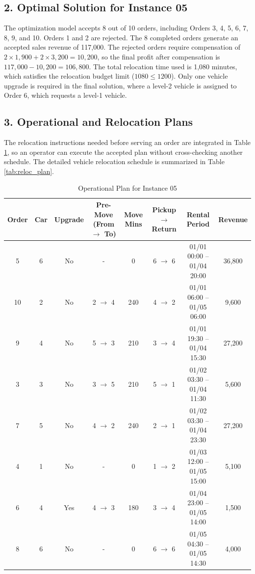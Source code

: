 \documentclass[10pt,a4paper]{article}
\begin{document}
\subsection*{2. Optimal Solution for Instance 05}

\hspace{2em} The optimization model accepts 8 out of 10 orders, including Orders 3, 4, 5, 6, 7, 8, 9, and 10. Orders 1 and 2 are rejected. The 8 completed orders generate an accepted sales revenue of 117,000. The rejected orders require compensation of $2 \times 1{,}900 + 2 \times 3{,}200 = 10{,}200$, so the final profit after compensation is $117{,}000 - 10{,}200 = 106{,}800$. The total relocation time used is 1,080 minutes, which satisfies the relocation budget limit ($1080 \le 1200$). Only one vehicle upgrade is required in the final solution, where a level-2 vehicle is assigned to Order 6, which requests a level-1 vehicle.

\subsection*{3. Operational and Relocation Plans}

The relocation instructions needed before serving an order are integrated in Table \ref{tab:op_plan}, so an operator can execute the accepted plan without cross-checking another schedule. The detailed vehicle relocation schedule is summarized in Table \ref{tab:reloc_plan}.

\begin{table}[htbp]
\centering
\small
\caption{Operational Plan for Instance 05\label{tab:op_plan}}
\begin{tabular}{cccccccc}
\toprule
Order & Car & Upgrade & Pre-Move (From $\to$ To) & Move Mins
& Pickup $\rightarrow$ Return & Rental Period & Revenue \\
\midrule
5 & 6 & No & - & 0 & 6 $\rightarrow$ 6 & 01/01 00:00 -- 01/04 20:00 & 36,800 \\
10 & 2 & No & 2 $\rightarrow$ 4 & 240 & 4 $\rightarrow$ 2 & 01/01 06:00 -- 01/05 06:00 & 9,600 \\
9 & 4 & No & 5 $\rightarrow$ 3 & 210 & 3 $\rightarrow$ 4 & 01/01 19:30 -- 01/04 15:30 & 27,200 \\
3 & 3 & No & 3 $\rightarrow$ 5 & 210 & 5 $\rightarrow$ 1 & 01/02 03:30 -- 01/04 11:30 & 5,600 \\
7 & 5 & No & 4 $\rightarrow$ 2 & 240 & 2 $\rightarrow$ 1 & 01/02 03:30 -- 01/04 23:30 & 27,200 \\
4 & 1 & No & - & 0 & 1 $\rightarrow$ 2 & 01/03 12:00 -- 01/05 15:00 & 5,100 \\
6 & 4 & Yes & 4 $\rightarrow$ 3 & 180 & 3 $\rightarrow$ 4 & 01/04 23:00 -- 01/05 14:00 & 1,500 \\
8 & 6 & No & - & 0 & 6 $\rightarrow$ 6 & 01/05 04:30 -- 01/05 14:30 & 4,000 \\
\bottomrule
\end{tabular}
\end{table}
\end{document}
